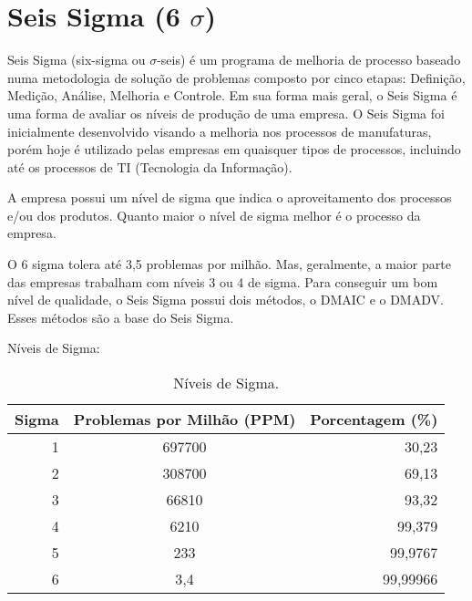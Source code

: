 \documentclass{abnt}
\begin{document}
    \maketitle
    
    \section*{Seis Sigma (6 $\sigma$)}
    
    Seis Sigma (six-sigma ou $\sigma$-seis) é um programa de melhoria de processo baseado numa 
	metodologia de solução de problemas composto por cinco etapas: Definição, Medição, Análise, 
	Melhoria e Controle. Em sua forma mais geral, o Seis Sigma é uma forma de avaliar os níveis 
	de produção de uma empresa. O Seis Sigma foi inicialmente desenvolvido visando a melhoria nos 
	processos de manufaturas, porém hoje é utilizado pelas empresas em quaisquer tipos de processos, 
	incluindo até os processos de TI (Tecnologia da Informação).
	
    A empresa  possui um nível de sigma que indica o aproveitamento dos processos e/ou dos produtos. Quanto maior
    o nível de sigma melhor é o processo da empresa.

    O 6 sigma tolera até 3,5 problemas por milhão. Mas, geralmente, a maior parte das empresas trabalham com níveis 3 ou 4 de sigma.    
    Para conseguir um bom nível de qualidade, o Seis Sigma possui dois métodos, o DMAIC e o DMADV. Esses métodos são a base do Seis Sigma.
   
    Níveis de Sigma:
    \begin{table}[h]
				\centering

				\begin{tabular}{rcr}
					\toprule
					Sigma & Problemas por Milhão (PPM) & Porcentagem (\%) \\
					\midrule
					 1 & 697700	& 30,23 	\\
					 2 & 308700 & 69,13 	\\
					 3 & 66810 	& 93,32 	\\
					 4 & 6210 	& 99,379 	\\
					 5 & 233 	& 99,9767 	\\
					 6 & 3,4 	& 99,99966 	\\
					\bottomrule		
				\end{tabular}
	
				\label{tab_niveisSigma}
				\caption{Níveis de Sigma.}
				
			\end{table}
   
\end{document}
